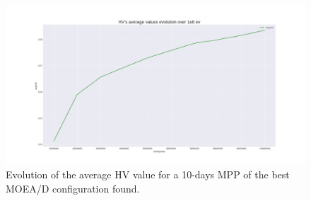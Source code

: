 \begin{figure}[H]
\centering
\includegraphics[scale=0.35]{../experiments/plots/avgHV_evolution_10_days.png}
\caption{Evolution of the average HV value for a 10-days MPP of the best MOEA/D configuration found.}
\label{fig:avg}
\end{figure}

